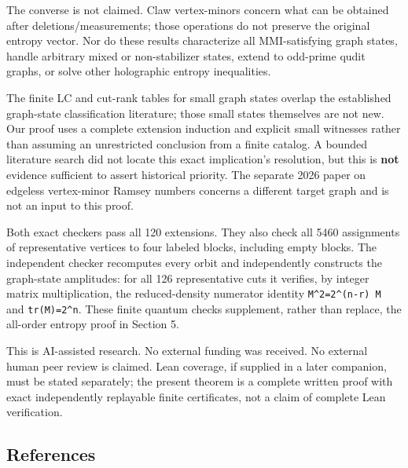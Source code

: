 \documentclass[
  11pt,
]{article}
\begin{document}
The converse is not claimed. Claw vertex-minors concern what can be
obtained after deletions/measurements; those operations do not preserve
the original entropy vector. Nor do these results characterize all
MMI-satisfying graph states, handle arbitrary mixed or non-stabilizer
states, extend to odd-prime qudit graphs, or solve other holographic
entropy inequalities.

The finite LC and cut-rank tables for small graph states overlap the
established graph-state classification literature; those small states
themselves are not new. Our proof uses a complete extension induction
and explicit small witnesses rather than assuming an unrestricted
conclusion from a finite catalog. A bounded literature search did not
locate this exact implication's resolution, but this is \textbf{not}
evidence sufficient to assert historical priority. The separate 2026
paper on edgeless vertex-minor Ramsey numbers concerns a different
target graph and is not an input to this proof.

Both exact checkers pass all 120 extensions. They also check all 5460
assignments of representative vertices to four labeled blocks, including
empty blocks. The independent checker recomputes every orbit and
independently constructs the graph-state amplitudes: for all 126
representative cuts it verifies, by integer matrix multiplication, the
reduced-density numerator identity \texttt{M\^{}2=2\^{}(n-r)\ M} and
\texttt{tr(M)=2\^{}n}. These finite quantum checks supplement, rather
than replace, the all-order entropy proof in Section 5.

This is AI-assisted research. No external funding was received. No
external human peer review is claimed. Lean coverage, if supplied in a
later companion, must be stated separately; the present theorem is a
complete written proof with exact independently replayable finite
certificates, not a claim of complete Lean verification.

\small\subsection{References}\label{references}
\end{document}

